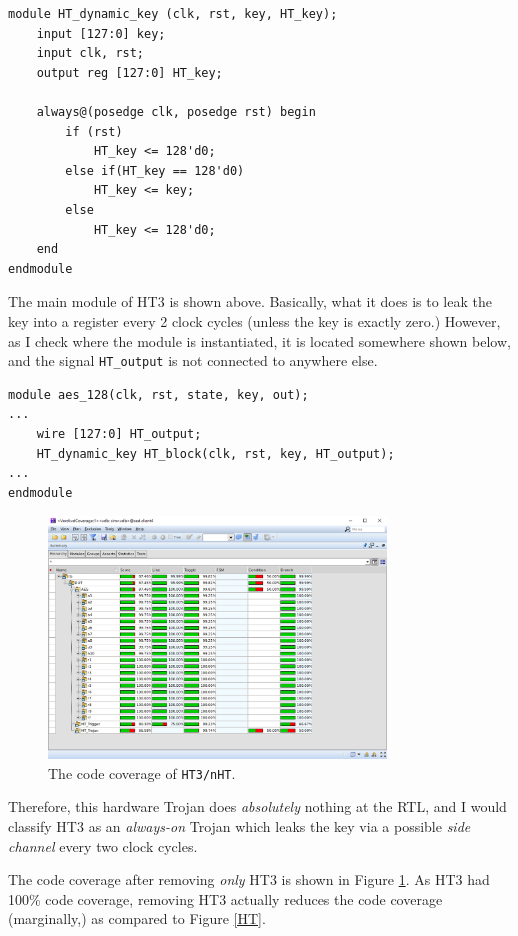 \documentclass{article}
\begin{document}
\clearpage

\begin{verbatim}
module HT_dynamic_key (clk, rst, key, HT_key);
    input [127:0] key;
    input clk, rst;
    output reg [127:0] HT_key;

    always@(posedge clk, posedge rst) begin
        if (rst)
            HT_key <= 128'd0;
        else if(HT_key == 128'd0)
            HT_key <= key;
        else
            HT_key <= 128'd0;
    end
endmodule
\end{verbatim}

The main module of HT3 is shown above. Basically, what it does is to leak the key into a register every 2 clock cycles (unless the key is exactly zero.) However, as I check where the module is instantiated, it is located somewhere shown below, and the signal \verb|HT_output| is not connected to anywhere else.

\begin{verbatim}
module aes_128(clk, rst, state, key, out);
...
    wire [127:0] HT_output;
    HT_dynamic_key HT_block(clk, rst, key, HT_output);
...
endmodule
\end{verbatim}

\begin{figure}[h] \centering
\includegraphics[width=0.8\textwidth]{nHT3}
\caption{The code coverage of \texttt{HT3/nHT}.}
\label{nHT3}
\end{figure}

Therefore, this hardware Trojan does \textit{absolutely} nothing at the RTL, and I would classify HT3 as an \textit{always-on} Trojan which leaks the key via a possible \textit{side channel} every two clock cycles.

The code coverage after removing \textit{only} HT3 is shown in Figure \ref{nHT3}. As HT3 had 100\% code coverage, removing HT3 actually reduces the code coverage (marginally,) as compared to Figure \ref{HT}.
\end{document}
